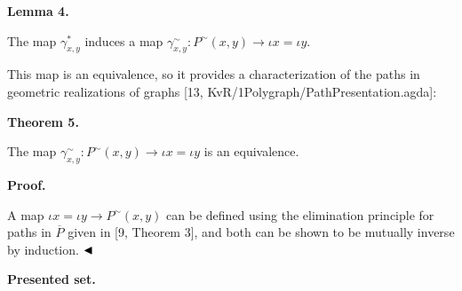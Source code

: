 \documentclass[10pt,a4paper]{amsart}
\begin{document}
 
 
\par\medskip\noindent\textbf{Lemma 4.}\par
 
 
The map $\gamma^{*}_{x,y}$ induces a map $\gamma^{\sim}_{x,y}:P^{\sim}(x,y)\to\iota x=\iota y$.\par
 
 
 
 
This map is an equivalence, so it provides a characterization of the paths in geometric realizations of graphs [13, KvR/1Polygraph/PathPresentation.agda]:\par
 
 
 
\par\medskip\noindent\textbf{Theorem 5.}\par
 
 
The map $\gamma^{\sim}_{x,y}:P^{\sim}(x,y)\to\iota x=\iota y$ is an equivalence.\par
 
 
 
 
 
\par\medskip\noindent\textbf{Proof.}\par
 
 
A map $\iota x=\iota y\to P^{\sim}(x,y)$ can be defined using the elimination principle for paths in $\overline{P}$ given in [9, Theorem 3], and both can be shown to be mutually inverse by induction. $\hfill\blacktriangleleft$\par
 
 
 
 
\par\medskip\noindent\textbf{Presented set.}\par
 
\end{document}

